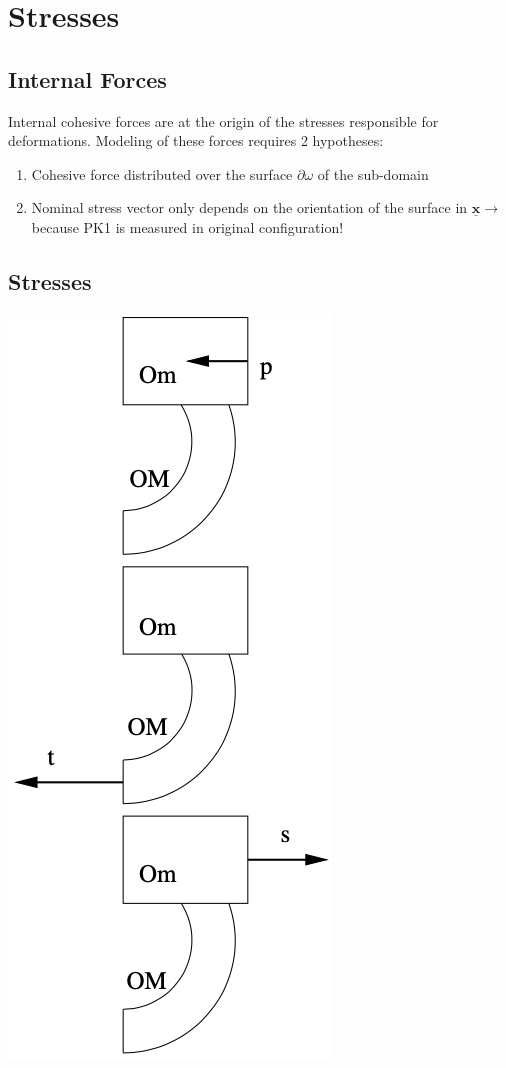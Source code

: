 \section{Stresses}
\subsection*{Internal Forces}
\smallskip

Internal cohesive forces are at the origin of the stresses responsible for deformations. Modeling of these forces requires 2 hypotheses: \\

\begin{enumerate}
\item Cohesive force distributed over the surface $\partial \omega$ of the sub-domain
\item Nominal stress vector only depends on the orientation of the surface in $\underline{\mathbf{x}} \rightarrow$ because PK1 is measured in original configuration! 
\end{enumerate}


\subsection*{Stresses}
\smallskip


\begin{center}
\includegraphics[width=0.3\linewidth]{img/StressVectors} \\
\end{center}


